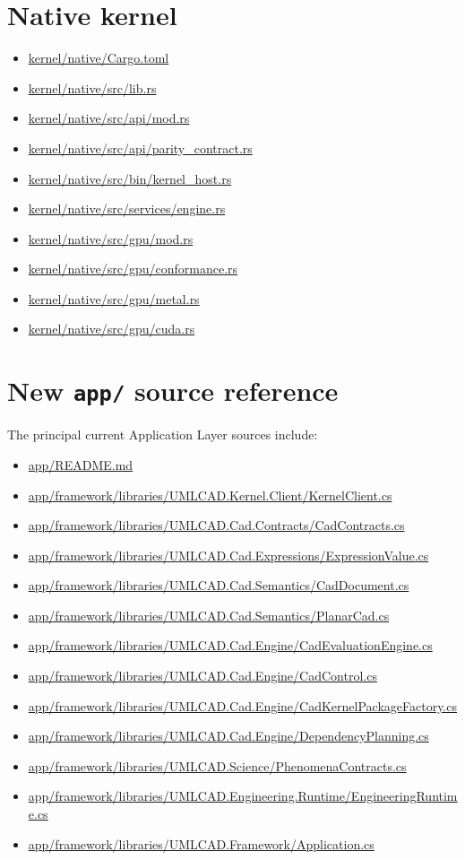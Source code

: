 \documentclass[11pt,a4paper]{report}
\newcommand{\pathref}[1]{\url{#1}}
\begin{document}
\section{Native kernel}
\begin{itemize}
\item \pathref{kernel/native/Cargo.toml}
\item \pathref{kernel/native/src/lib.rs}
\item \pathref{kernel/native/src/api/mod.rs}
\item \pathref{kernel/native/src/api/parity_contract.rs}
\item \pathref{kernel/native/src/bin/kernel_host.rs}
\item \pathref{kernel/native/src/services/engine.rs}
\item \pathref{kernel/native/src/gpu/mod.rs}
\item \pathref{kernel/native/src/gpu/conformance.rs}
\item \pathref{kernel/native/src/gpu/metal.rs}
\item \pathref{kernel/native/src/gpu/cuda.rs}
\end{itemize}

\section{New \texttt{app/} source reference}

The principal current Application Layer sources include:

\begin{itemize}
\item \pathref{app/README.md}
\item \pathref{app/framework/libraries/UMLCAD.Kernel.Client/KernelClient.cs}
\item \pathref{app/framework/libraries/UMLCAD.Cad.Contracts/CadContracts.cs}
\item \pathref{app/framework/libraries/UMLCAD.Cad.Expressions/ExpressionValue.cs}
\item \pathref{app/framework/libraries/UMLCAD.Cad.Semantics/CadDocument.cs}
\item \pathref{app/framework/libraries/UMLCAD.Cad.Semantics/PlanarCad.cs}
\item \pathref{app/framework/libraries/UMLCAD.Cad.Engine/CadEvaluationEngine.cs}
\item \pathref{app/framework/libraries/UMLCAD.Cad.Engine/CadControl.cs}
\item \pathref{app/framework/libraries/UMLCAD.Cad.Engine/CadKernelPackageFactory.cs}
\item \pathref{app/framework/libraries/UMLCAD.Cad.Engine/DependencyPlanning.cs}
\item \pathref{app/framework/libraries/UMLCAD.Science/PhenomenaContracts.cs}
\item \pathref{app/framework/libraries/UMLCAD.Engineering.Runtime/EngineeringRuntime.cs}
\item \pathref{app/framework/libraries/UMLCAD.Framework/Application.cs}
\end{itemize}
\end{document}
